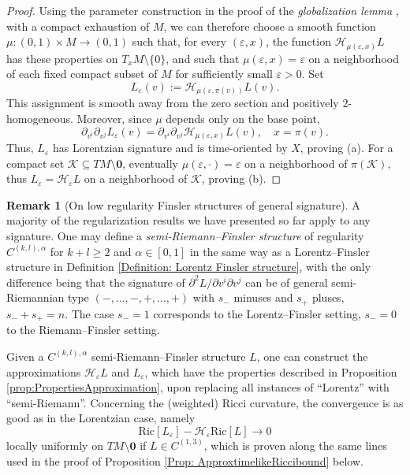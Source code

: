 \documentclass[a4paper,11pt]{article}
\numberwithin{equation}{section}
\theoremstyle{definition}
\newtheorem{Remark}[Definition]{Remark}
\theoremstyle{plain}
\newcommand{\eps}{\varepsilon}
\newcommand{\Ric}{\mathrm{Ric}}
\begin{document}
\begin{proof}
Using the parameter construction in the proof of the \emph{globalization lemma} \cite[Lem.\ 4.3]{HoermannKunzingerSteinbauer-WaveEq}, with a compact exhaustion of $M$, we can therefore choose a smooth function $\mu : (0,1)\times M \rightarrow (0,1)$ such that, for every $(\varepsilon,x)$, the function $\mathcal{H}_{\mu(\varepsilon,x)}L$ has these properties on $T_xM\setminus\{0\}$, and such that $\mu(\varepsilon,x)=\varepsilon$ on a neighborhood of each fixed compact subset of $M$ for sufficiently small $\varepsilon >0$.
Set
\[
    L_\varepsilon(v)
    := \mathcal{H}_{\mu(\varepsilon,\pi(v))}L(v).
\]
This assignment is smooth away from the zero section and positively $2$-homogeneous. 
Moreover, since $\mu$ depends only on the base point,
\[
    \partial_{v^i}\partial_{v^j}L_\varepsilon(v)
    =            \partial_{v^i}\partial_{v^j}\mathcal{H}_{\mu(\eps,x)}L(v),
    \quad x=\pi(v).
\]
Thus, $L_\varepsilon$ has Lorentzian signature and is time-oriented by $X$, proving (a). 
For a compact set $\mathcal K \subseteq TM\setminus \mathbf 0$, eventually $\mu(\varepsilon,\cdot)=\varepsilon$ on a neighborhood of $\pi(\mathcal K)$, thus $L_\varepsilon=\mathcal H_\varepsilon L$ on a neighborhood of $\mathcal K$, proving (b).
\end{proof}


\begin{Remark}[On low regularity Finsler structures of general signature]
\label{Remark: general semi Riemann}
A majority of the regularization results we have presented so far apply to any signature.
One may define a \emph{semi-Riemann--Finsler structure} of regularity $C^{(k,l),\alpha}$ for $k + l \geq 2$ and $\alpha \in [0,1]$ in the same way as a Lorentz--Finsler structure in Definition \ref{Definition: Lorentz Finsler structure}, with the only difference being that the signature of $\partial^2 L/\partial v^i \partial v^j$ can be of general semi-Riemannian type $(-,\dots,-,+,\dots,+)$ with $s_-$ minuses and $s_+$ pluses, $s_- + s_+ = n$.
The case $s_- = 1$ corresponds to the Lorentz--Finsler setting, $s_- = 0$ to the Riemann--Finsler setting.

Given a $C^{(k,l),\alpha}$ semi-Riemann--Finsler structure $L$, one can construct the approximations $\mathcal{H}_{\eps}L$ and $L_\varepsilon$, which have the properties described in Proposition \ref{prop:PropertiesApproximation}, upon replacing all instances of ``Lorentz'' with ``semi-Riemann''.
Concerning the (weighted) Ricci curvature, the convergence is as good as in the Lorentzian case, namely
\begin{equation*}
    \Ric[L_\eps] -\mathcal{H}_\eps \Ric[L] \to 0
\end{equation*}
locally uniformly on $TM\setminus \mathbf 0$ if $L \in C^{(1,3)}$, which is proven along the same lines used in the proof of Proposition \ref{Prop: ApproxtimelikeRiccibound} below.
\end{Remark}
\end{document}
